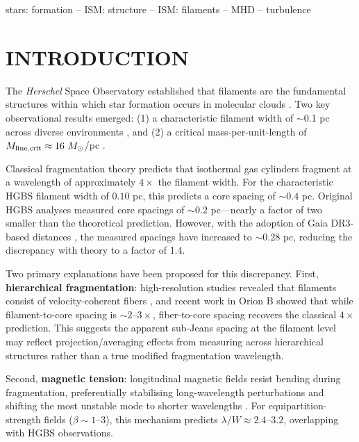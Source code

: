 \documentclass[twoside,twocolumn]{mnras}
\begin{document}
\begin{keywords}
stars: formation -- ISM: structure -- ISM: filaments -- MHD -- turbulence
\end{keywords}


\section{INTRODUCTION}

The \textit{Herschel} Space Observatory established that filaments are the fundamental structures within which star formation occurs in molecular clouds \citep{Andre2010}. Two key observational results emerged: (1) a characteristic filament width of $\sim$0.1 pc across diverse environments \citep{Arzoumanian2011}, and (2) a critical mass-per-unit-length of $M_{\rm line,crit} \approx 16~M_\odot$/pc \citep{Ostriker1964}.

Classical fragmentation theory \citep{Inutsuka1992} predicts that isothermal gas cylinders fragment at a wavelength of approximately $4\times$ the filament width. For the characteristic HGBS filament width of $0.10$ pc, this predicts a core spacing of $\sim0.4$ pc. Original HGBS analyses measured core spacings of $\sim0.2$ pc—nearly a factor of two smaller than the theoretical prediction. However, with the adoption of Gaia DR3-based distances \citep{Zhang2023}, the measured spacings have increased to $\sim0.28$ pc, reducing the discrepancy with theory to a factor of 1.4.

Two primary explanations have been proposed for this discrepancy. First, \textbf{hierarchical fragmentation}: high-resolution studies revealed that filaments consist of velocity-coherent fibers \citep{Hacar2013}, and recent work in Orion B \citep{Yang2024} showed that while filament-to-core spacing is $\sim2$--$3\times$, fiber-to-core spacing recovers the classical $4\times$ prediction. This suggests the apparent sub-Jeans spacing at the filament level may reflect projection/averaging effects from measuring across hierarchical structures rather than a true modified fragmentation wavelength.

Second, \textbf{magnetic tension}: longitudinal magnetic fields resist bending during fragmentation, preferentially stabilising long-wavelength perturbations and shifting the most unstable mode to shorter wavelengths \citep{Nakamura1993}. For equipartition-strength fields ($\beta \sim 1$--$3$), this mechanism predicts $\lambda/W \approx 2.4$--$3.2$, overlapping with HGBS observations.
\end{document}
